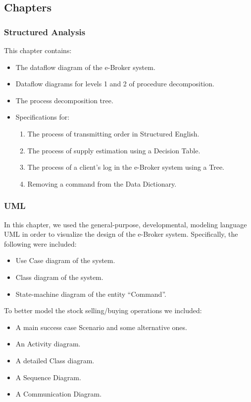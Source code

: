 \documentclass{article}
\begin{document}
\subsection{Chapters} 

\subsubsection{Structured Analysis}
This chapter contains:
\begin{itemize}
\item The dataflow diagram of the e-Broker system.
\item Dataflow diagrams for levels 1 and 2 of procedure decomposition.
\item The process decomposition tree.
\item Specifications for:
\begin{enumerate}
\item The process of transmitting order in Structured English.
\item The process of supply estimation using a Decision Table.
\item The process of a client's log in the e-Broker system using a Tree.
\item Removing a command from the Data Dictionary.  
\end{enumerate}
\end{itemize} 

\subsubsection{UML}
In this chapter, we used the general-purpose, developmental, modeling language UML in order to visualize the design of the e-Broker system. Specifically, the following were included:

\begin{itemize}[{label=\tiny$\triangleright$}]
\item Use Case diagram of the system.
\item Class diagram of the system.
\item State-machine diagram of the entity ``Command''.
\end{itemize}

To better model the stock selling/buying operations we included:

\begin{itemize}[{label=\tiny$\triangleright$}]
\item A main success case Scenario and some alternative ones.
\item An Activity diagram.
\item A detailed Class diagram.
\item A Sequence Diagram.
\item A Communication Diagram.
\end{itemize}
\end{document}
